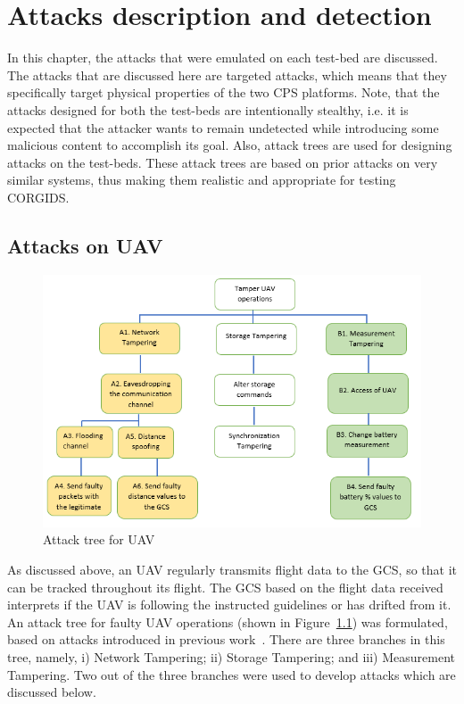 
\chapter{\textbf{Attacks description and detection}}
\label{ch:Attacks}

In this chapter, the attacks that were emulated on each test-bed are discussed. The attacks that are discussed here are  targeted attacks, which means that they specifically target physical properties of the two \ac{CPS} platforms. Note, that the attacks designed for both the test-beds are intentionally stealthy, i.e. it is expected that the attacker wants to remain undetected while introducing some malicious content to accomplish its goal. Also, attack trees are used for designing attacks on the test-beds. These attack trees are based on prior attacks on very similar systems, thus making them realistic and appropriate for testing \ac{CORGIDS}.


\section{Attacks on \ac{UAV}}

\begin{figure}[ht]
    \centering
    \includegraphics[scale=0.55,keepaspectratio = true]{Graphics/AttackTreeUAVNew.png}
    \caption{Attack tree for UAV}
    \label{fig:attackTreeUAV}
\end{figure}
As discussed above, an \ac{UAV} regularly transmits flight data to the \ac{GCS}, so that it can be tracked throughout its flight. The \ac{GCS} based on the flight data received interprets if the \ac{UAV} is following the instructed guidelines or has drifted from it. An attack tree for faulty \ac{UAV} operations (shown in Figure~\ref{fig:attackTreeUAV}) was formulated, based on attacks introduced in previous work~\cite{javaid2012cyber, mitchell2012specification}. There are three branches in this tree, namely, i) Network Tampering; ii) Storage Tampering; and iii) Measurement Tampering. Two out of the three branches were used to develop attacks which are discussed below.

